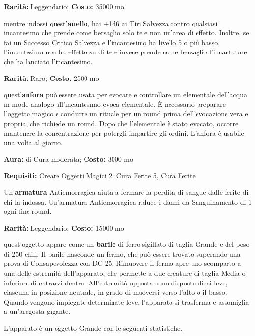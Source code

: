 \begin{multicols}{2}

\textbf{Rarità:} Leggendario; \textbf{Costo:} 35000 mo

mentre indossi quest'\textbf{anello}, hai +1d6 ai Tiri Salvezza contro qualsiasi incantesimo che prende come bersaglio solo te e non un'area di effetto. Inoltre, se fai un Successo Critico Salvezza e l'incantesimo ha livello 5 o più basso, l'incantesimo non ha effetto su di te e invece prende come bersaglio l'incantatore che ha lanciato l'incantesimo.


\textbf{Rarità:} Raro; \textbf{Costo:} 2500 mo

quest'\textbf{anfora} può essere usata per evocare e controllare un elementale dell'acqua in modo analogo all'incantesimo evoca elementale. È necessario preparare l'oggetto magico e condurre un rituale per un round prima dell'evocazione vera e propria, che richiede un round. Dopo che l'elementale è stato evocato, occorre mantenere la concentrazione per potergli impartire gli ordini. L'anfora è usabile una volta al giorno.


\textbf{Aura:} di Cura moderata; \textbf{Costo:} 3000 mo

\textbf{Requisiti:} Creare Oggetti Magici 2, Cura Ferite 5, Cura Ferite

Un'\textbf{armatura} Antiemorragica aiuta a fermare la perdita di sangue dalle ferite di chi la indossa. Un'armatura Antiemorragica riduce i danni da Sanguinamento di 1 ogni fine round.


\textbf{Rarità:} Leggendario; \textbf{Costo:} 15000 mo

quest'oggetto appare come un \textbf{barile} di ferro sigillato di taglia Grande e del peso di 250 chili. Il barile nasconde un fermo, che può essere trovato superando una prova di Consapevolezza con DC 25. Rimuovere il fermo apre uno scomparto a una delle estremità dell'apparato, che permette a due creature di taglia Media o inferiore di entrarvi dentro. All'estremità opposta sono disposte dieci leve, ciascuna in posizione neutrale, in grado di muoversi verso l'alto o il basso. Quando vengono impiegate determinate leve, l'apparato si trasforma e assomiglia a un'aragosta gigante.

L'apparato è un oggetto Grande con le seguenti statistiche.


\end{multicols}
